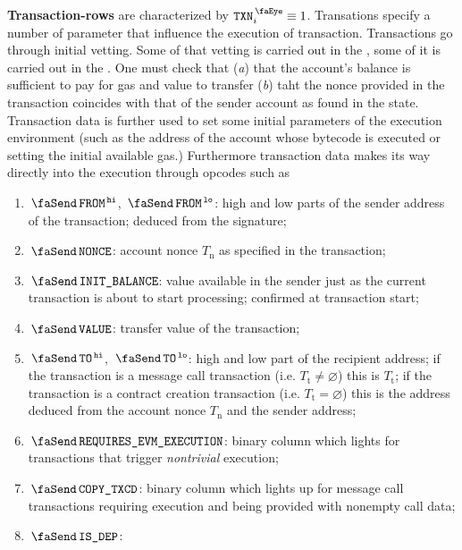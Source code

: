 \textbf{Transaction-rows} are characterized by $\peekTransaction_{i} \equiv 1$.
Transations specify a number of parameter that influence the execution of transaction.
Transactions go through initial vetting.
Some of that vetting is carried out in the \hubMod{}, some of it is carried out in the \txnDataMod{}.
One must check that
(\emph{a}) that the account's balance is sufficient to pay for gas and value to transfer
(\emph{b}) taht the nonce provided in the transaction coincides with that of the sender account as found in the state.
Transaction data is further used to set some initial parameters of the execution environment (such as the address of the account whose bytecode is executed or setting the initial available gas.)
Furthermore transaction data makes its way directly into the execution through opcodes such as \inst{}
\begin{enumerate}
	\item
		\godGiven{}
		$\txFrom\high$, $\txFrom\low$:
		high and low parts of the sender address of the transaction; deduced from the signature;
	\item
		\godGiven{}
		$\txNonce$:
		account nonce $T_\text{n}$ as specified in the transaction;
	\item
		\godGiven{}
		\markAsJustifiedHere{}
		$\txInitialBalance$:
		value available in the sender just as the current transaction is about to start processing; confirmed at transaction start;
	\item
		\godGiven{}
		$\txValue$:
		transfer value of the transaction;
	\item
		\godGiven{}
		$\txTo\high$, $\txTo\low$:
		high and low part of the recipient address;
		if the transaction is a message call transaction (i.e. $T_{\text{t}} \neq \varnothing$) this is $T_{\text{t}}$;
		if the transaction is a contract creation transaction (i.e. $T_{\text{t}} = \varnothing$) this is the address deduced from the account nonce $T_\text{n}$ and the sender address;
	\item
		\godGiven{}
		\markAsPartiallyJustifiedHere{}
		$\txRequiresEvmExecution$:
		binary column which lights for transactions that trigger \emph{nontrivial} \evm{} execution;
	\item
		\godGiven{}
		$\txCopyTxcd$:
		binary column which lights up for message call transactions requiring \evm{} execution and being provided with nonempty call data;
	\item
		\godGiven{}
		$\txIsDeployment$:

\end{enumerate}
